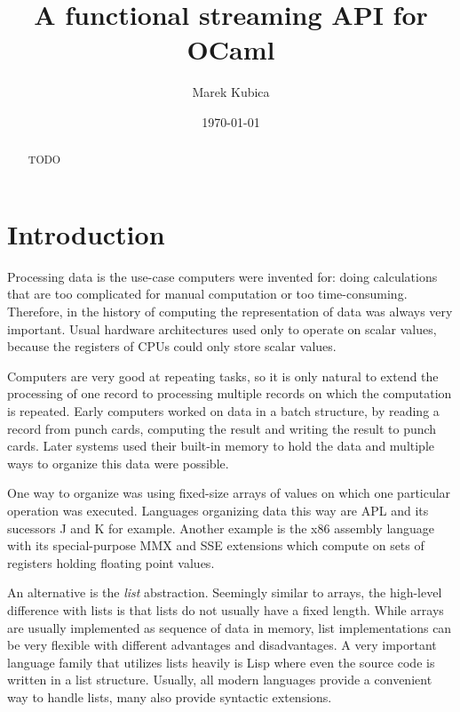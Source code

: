 \documentclass[parskip=half]{scrreprt}
\author{Marek Kubica}
\title{A functional streaming API for OCaml}
\date{\today}
\begin{document}




{}
\begin{abstract}
	\subsubsection*{\abstractname}
	TODO
\end{abstract}

\tableofcontents

\chapter{Introduction}
\label{sec:intro}

Processing data is the use-case computers were invented for: doing calculations
that are too complicated for manual computation or too time-consuming.
Therefore, in the history of computing the representation of data was always
very important. Usual hardware architectures used only to operate on scalar
values, because the registers of CPUs could only store scalar values.

Computers are very good at repeating tasks, so it is only natural to extend the
processing of one record to processing multiple records on which the
computation is repeated. Early computers worked on data in a batch structure,
by reading a record from punch cards, computing the result and writing the
result to punch cards. Later systems used their built-in memory to hold the
data and multiple ways to organize this data were possible.

One way to organize was using fixed-size arrays of values on which one
particular operation was executed. Languages organizing data this way are APL
and its sucessors J and K for example. Another example is the x86 assembly
language with its special-purpose MMX and SSE extensions which compute on sets
of registers holding floating point values.

An alternative is the \emph{list} abstraction. Seemingly similar to arrays, the
high-level difference with lists is that lists do not usually have a fixed
length. While arrays are usually implemented as sequence of data in memory,
list implementations can be very flexible with different advantages and
disadvantages. A very important language family that utilizes lists heavily is
Lisp where even the source code is written in a list structure. Usually, all
modern languages provide a convenient way to handle lists, many also provide
syntactic extensions.
\end{document}
